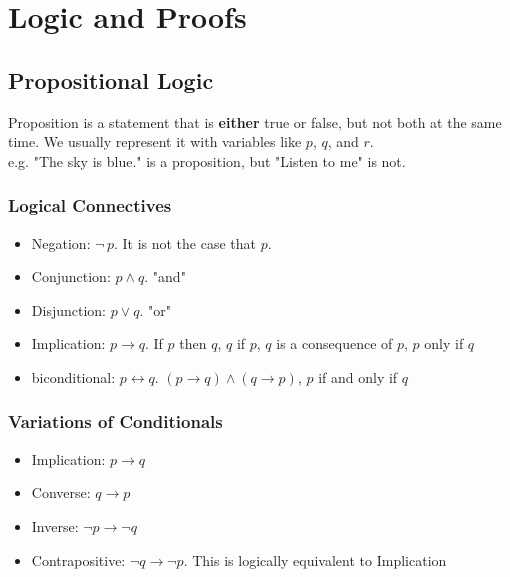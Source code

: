 \documentclass[11pt]{article}
\begin{document}
\pagestyle{plain}
\begin{center}
    \tableofcontents
\end{center}
\newpage
\setcounter{page}{1}
\pagestyle{fancy}
\section{Logic and Proofs}
\subsection{Propositional Logic}
Proposition is a statement that is \textbf{either} true or false, but not both at the same time. We usually represent it with variables like $p$, $q$, and $r$.\\
e.g. "The sky is blue." is a proposition, but "Listen to me" is not. 
\subsubsection{Logical Connectives}
\begin{itemize}
    \item Negation: $\lnot \,p$. It is not the case that $p$.
    \item Conjunction: $p \land q$. "and"
    \item Disjunction: $p \lor q$. "or"
    \item Implication: $p \rightarrow q$. If $p$ then $q$, $q$ if $p$, $q$ is a consequence of $p$, $p$ only if $q$
    \item biconditional: $p \leftrightarrow q$. $(p\rightarrow q)\land(q \rightarrow p)$, $p$ if and only if $q$
\end{itemize}
\subsubsection{Variations of Conditionals}
\begin{itemize}
    \item Implication: $p \rightarrow q$
    \item Converse: $q \rightarrow p$
    \item Inverse: $\lnot p \rightarrow \lnot q$
    \item Contrapositive: $\lnot q\rightarrow \lnot p$. This is logically equivalent to Implication
\end{itemize}
\end{document}
